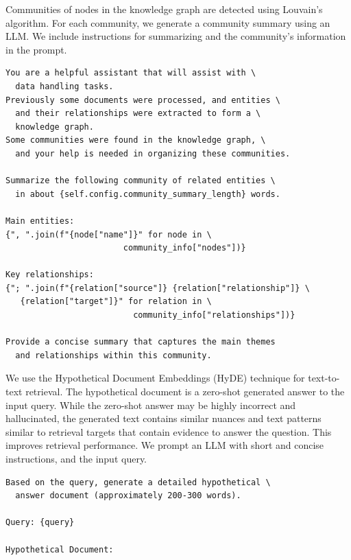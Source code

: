 Communities of nodes in the knowledge graph are detected using Louvain's algorithm.
For each community, we generate a community summary using an LLM.
We include instructions for summarizing and the community's information in the prompt.
\begin{verbatim}
You are a helpful assistant that will assist with \
  data handling tasks.
Previously some documents were processed, and entities \
  and their relationships were extracted to form a \
  knowledge graph.
Some communities were found in the knowledge graph, \
  and your help is needed in organizing these communities.

Summarize the following community of related entities \
  in about {self.config.community_summary_length} words.

Main entities:
{", ".join(f"{node["name"]}" for node in \
                        community_info["nodes"])}

Key relationships:
{"; ".join(f"{relation["source"]} {relation["relationship"]} \
   {relation["target"]}" for relation in \
                          community_info["relationships"])}

Provide a concise summary that captures the main themes 
  and relationships within this community.
\end{verbatim}

We use the Hypothetical Document Embeddings (HyDE) technique for text-to-text retrieval.
The hypothetical document is a zero-shot generated answer to the input query.
While the zero-shot answer may be highly incorrect and hallucinated, 
the generated text contains similar nuances and text patterns similar to retrieval targets that contain evidence to answer the question.
This improves retrieval performance.
We prompt an LLM with short and concise instructions, and the input query.
\begin{verbatim}
Based on the query, generate a detailed hypothetical \
  answer document (approximately 200-300 words).

Query: {query}

Hypothetical Document:
\end{verbatim}

